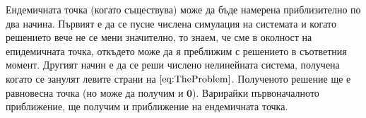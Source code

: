 
Ендемичната точка (когато съществува) може да бъде намерена приблизително по два начина.
Първият е да се пусне числена симулация на системата и когато решението вече не се мени значително, то знаем, че сме в околност на епидемичната точка, откъдето може да я преближим с решението в съответния момент.
Другият начин е да се реши числено нелинейната система, получена когато се занулят левите страни на $\ref{eq:TheProblem}$.
Полученото решение ще е равновесна точка (но може да получим и $\mathbf{0}$).
Варирайки първоначалното приближение, ще получим и приближение на ендемичната точка.
